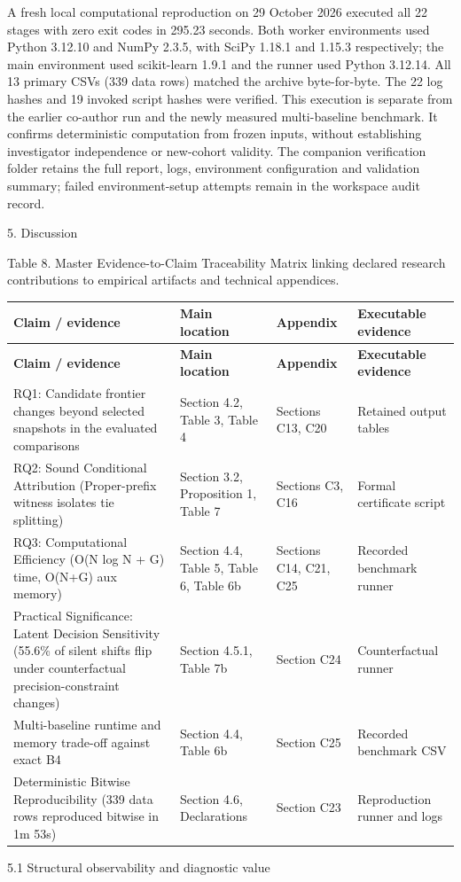 \documentclass[11pt,a4paper]{article}
\begin{document}
A fresh local computational reproduction on 29 October 2026 executed all 22 stages with zero exit codes in 295.23 seconds. Both worker environments used Python 3.12.10 and NumPy 2.3.5, with SciPy 1.18.1 and 1.15.3 respectively; the main environment used scikit-learn 1.9.1 and the runner used Python 3.12.14. All 13 primary CSVs (339 data rows) matched the archive byte-for-byte. The 22 log hashes and 19 invoked script hashes were verified. This execution is separate from the earlier co-author run and the newly measured multi-baseline benchmark. It confirms deterministic computation from frozen inputs, without establishing investigator independence or new-cohort validity. The companion verification folder retains the full report, logs, environment configuration and validation summary; failed environment-setup attempts remain in the workspace audit record.

5. Discussion

Table 8. Master Evidence-to-Claim Traceability Matrix linking declared research contributions to empirical artifacts and technical appendices.

{\footnotesize
\setlength{\tabcolsep}{3pt}
\renewcommand{\arraystretch}{1.15}
\begin{longtable}{>{\raggedright\arraybackslash}p{0.36522\dimexpr\textwidth-8\tabcolsep\relax}>{\raggedright\arraybackslash}p{0.19130\dimexpr\textwidth-8\tabcolsep\relax}>{\raggedright\arraybackslash}p{0.13913\dimexpr\textwidth-8\tabcolsep\relax}>{\raggedright\arraybackslash}p{0.30435\dimexpr\textwidth-8\tabcolsep\relax}}
\toprule
\textbf{Claim / evidence} & \textbf{Main location} & \textbf{Appendix} & \textbf{Executable evidence} \\
\midrule
\endfirsthead
\toprule
\textbf{Claim / evidence} & \textbf{Main location} & \textbf{Appendix} & \textbf{Executable evidence} \\
\midrule
\endhead
RQ1: Candidate frontier changes beyond selected snapshots in the evaluated comparisons & Section 4.2, Table 3, Table 4 & Sections C13, C20 & Retained output tables \\
RQ2: Sound Conditional Attribution (Proper-prefix witness isolates tie splitting) & Section 3.2, Proposition 1, Table 7 & Sections C3, C16 & Formal certificate script \\
RQ3: Computational Efficiency (O(N log N + G) time, O(N+G) aux memory) & Section 4.4, Table 5, Table 6, Table 6b & Sections C14, C21, C25 & Recorded benchmark runner \\
Practical Significance: Latent Decision Sensitivity (55.6\% of silent shifts flip under counterfactual precision-constraint changes) & Section 4.5.1, Table 7b & Section C24 & Counterfactual runner \\
Multi-baseline runtime and memory trade-off against exact B4 & Section 4.4, Table 6b & Section C25 & Recorded benchmark CSV \\
Deterministic Bitwise Reproducibility (339 data rows reproduced bitwise in 1m 53s) & Section 4.6, Declarations & Section C23 & Reproduction runner and logs \\
\bottomrule
\end{longtable}
}
5.1 Structural observability and diagnostic value
\end{document}
